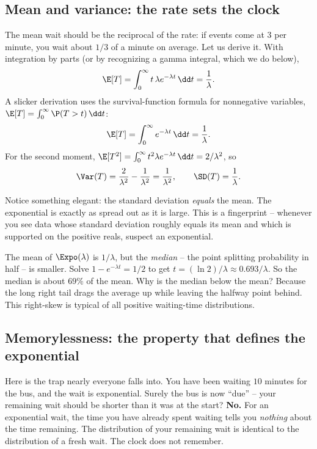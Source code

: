\subsection{Mean and variance: the rate sets the clock}

The mean wait should be the reciprocal of the rate: if events come at $3$ per
minute, you wait about $1/3$ of a minute on average. Let us derive it. With
integration by parts (or by recognizing a gamma integral, which we do below),
\[
  \E[T] = \int_0^\infty t\,\lambda e^{-\lambda t}\,\dd t = \frac{1}{\lambda}.
\]
A slicker derivation uses the survival-function formula for nonnegative
variables, $\E[T] = \int_0^\infty \P(T>t)\,\dd t$:
\[
  \E[T] = \int_0^\infty e^{-\lambda t}\,\dd t = \frac{1}{\lambda}.
\]
For the second moment, $\E[T^2] = \int_0^\infty t^2 \lambda e^{-\lambda t}\,\dd t
= 2/\lambda^2$, so
\[
  \Var(T) = \frac{2}{\lambda^2} - \frac{1}{\lambda^2} = \frac{1}{\lambda^2},
  \qquad \SD(T) = \frac{1}{\lambda}.
\]

Notice something elegant: the standard deviation \emph{equals} the mean. The
exponential is exactly as spread out as it is large. This is a fingerprint --
whenever you see data whose standard deviation roughly equals its mean and which
is supported on the positive reals, suspect an exponential.

\begin{walkbox}
The mean of $\Expo(\lambda)$ is $1/\lambda$, but the \emph{median} -- the point
splitting probability in half -- is smaller. Solve $1 - e^{-\lambda t} = 1/2$ to
get $t = (\ln 2)/\lambda \approx 0.693/\lambda$. So the median is about $69\%$ of
the mean. Why is the median below the mean? Because the long right tail drags the
average up while leaving the halfway point behind. This right-skew is typical of
all positive waiting-time distributions.
\end{walkbox}

\subsection{Memorylessness: the property that defines the exponential}
\label{ch11:memoryless}

\begin{trapbox}
Here is the trap nearly everyone falls into. You have been waiting $10$ minutes
for the bus, and the wait is exponential. Surely the bus is now ``due'' -- your
remaining wait should be shorter than it was at the start? \textbf{No.} For an
exponential wait, the time you have already spent waiting tells you
\emph{nothing} about the time remaining. The distribution of your remaining wait
is identical to the distribution of a fresh wait. The clock does not remember.
\end{trapbox}

